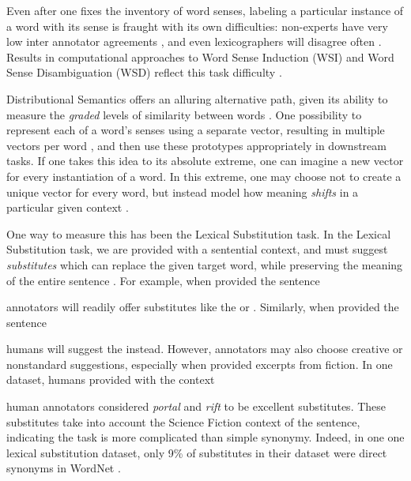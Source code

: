 Even after one fixes the inventory of word senses, labeling a particular
instance of a word with its sense is fraught with its own difficulties:
non-experts have very low inter annotator agreements \cite{yong:1999:siglex},
and even lexicographers will disagree often \cite{kilgarriff:2000:ch}.
Results in computational approaches to Word Sense Induction (WSI) and Word
Sense Disambiguation (WSD) reflect this task difficulty \cite{needcite}.

Distributional Semantics offers an alluring alternative path, given its ability
to measure the {\em graded} levels of similarity between words
\cite{erk:2008:emnlp}.  One possibility to represent each of a word's senses
using a separate vector, resulting in multiple vectors per word
\cite{reisinger:2010:naacl,huang:2012:acl}, and then use
these prototypes appropriately in downstream tasks. If one takes this idea to
its absolute extreme, one can imagine a new vector for every instantiation of a
word. In this extreme, one may choose not to create a unique vector for every
word, but instead model how meaning {\em shifts} in a particular given context
\cite{erk:2008:emnlp,erk:2010:gems}.

One way to measure this has been the Lexical Substitution task. In
the Lexical Substitution task, we are provided with a sentential context, and
must suggest {\em substitutes} which can replace the given target word, while
preserving the meaning of the entire sentence
\cite{mccarthy:2007:semeval,biemann:2012:lrec,kremer:2014:eacl}. For
example, when provided the sentence
\begin{quote}
\end{quote}
annotators will readily offer substitutes like the  or
. Similarly, when provided the sentence
\begin{quote}
\end{quote}
humans will suggest the  instead. However, annotators
may also choose creative or nonstandard suggestions, especially when provided
excerpts from fiction. In one dataset, humans provided with the context
\begin{quote}
\end{quote}
human annotators considered {\em portal} and {\em rift} to be excellent
substitutes. These substitutes take into account the Science Fiction context of
the sentence, indicating the task is more complicated than simple synonymy.
Indeed, in one one lexical substitution dataset, only 9\% of substitutes in
their dataset were direct synonyms in WordNet \cite{kremer:2014:eacl}.

